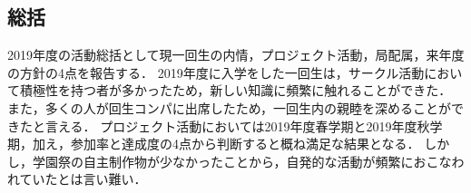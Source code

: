 \subsection*{\firstGrade{}総括}




2019年度の活動総括として現一回生の内情，プロジェクト活動，局配属，来年度の方針の4点を報告する．
2019年度に入学をした一回生は，サークル活動において積極性を持つ者が多かったため，新しい知識に頻繁に触れることができた．
また，多くの人が回生コンパに出席したため，一回生内の親睦を深めることができたと言える．
プロジェクト活動においては2019年度春学期と2019年度秋学期，加え，参加率と達成度の4点から判断すると概ね満足な結果となる．
しかし，学園祭の自主制作物が少なかったことから，自発的な活動が頻繁におこなわれていたとは言い難い．

